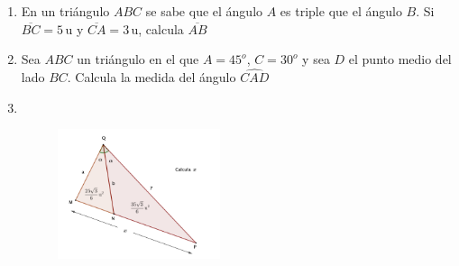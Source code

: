 \vspace{5mm}
\begin{enumerate}

\item	En un triángulo $ABC$ se sabe que el ángulo $A$ es triple que el ángulo $B$. Si $\overline{BC}=5\, \mathrm{u}$ y $\overline{CA}=3\, \mathrm{u}$, calcula $\overline{AB}$

\vspace{-6mm}
\begin{flushright}
\begin{footnotesize} \textcolor{gris}{}	\end{footnotesize}
\end{flushright}


\item	 Sea $ABC$ un triángulo en el que $A=45^o$, $C=30^o$ y sea $D$ el punto medio del lado $BC$. Calcula la medida del ángulo $\widehat{CAD}$

\vspace{-6mm}
\begin{flushright}
\begin{footnotesize} \textcolor{gris}{}	\end{footnotesize}
\end{flushright}


\item	$\quad$


\begin{figure}[H]
	\centering
	\includegraphics[width=0.45\textwidth]{img-triang/triang24.png}
\end{figure}

\vspace{-6mm}
\begin{flushright}
\begin{footnotesize} \textcolor{gris}{}	\end{footnotesize}
\end{flushright}



\end{enumerate}
